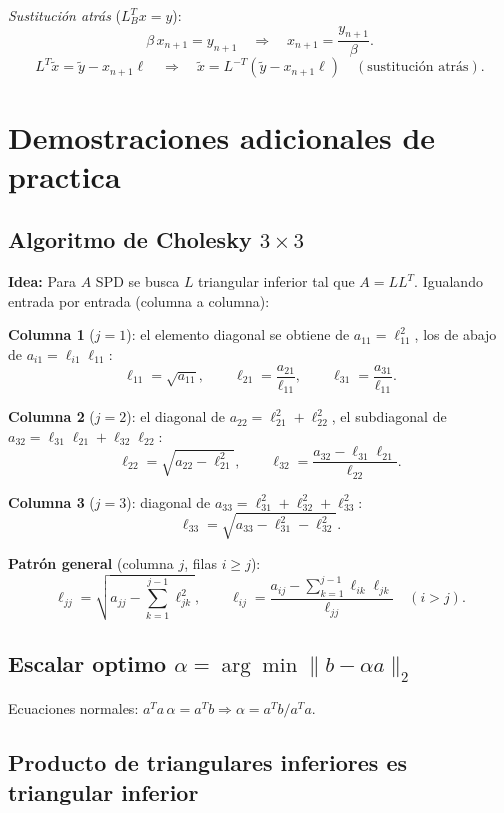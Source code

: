 \documentclass[11pt,a4paper]{article}
\begin{document}
\textit{Sustitución atrás} ($L_B^Tx=y$):
\[
  \beta\,x_{n+1}=y_{n+1} \quad\Rightarrow\quad x_{n+1}=\frac{y_{n+1}}{\beta}.
\]
\[
  L^T\tilde x = \tilde y - x_{n+1}\ell \quad\Rightarrow\quad \tilde x=L^{-T}(\tilde y-x_{n+1}\ell) \quad(\text{sustitución atrás}).
\]

\section{Demostraciones adicionales de practica}

\subsection{Algoritmo de Cholesky $3\times3$}
\label{sec:cholesky_3x3}

\textbf{Idea:} Para $A$ SPD se busca $L$ triangular inferior tal que $A=LL^T$. Igualando entrada por entrada (columna a columna):

\textbf{Columna 1} ($j=1$): el elemento diagonal se obtiene de $a_{11}=\ell_{11}^2$, los de abajo de $a_{i1}=\ell_{i1}\ell_{11}$:
\[
  \ell_{11}=\sqrt{a_{11}}, \qquad \ell_{21}=\frac{a_{21}}{\ell_{11}}, \qquad \ell_{31}=\frac{a_{31}}{\ell_{11}}.
\]

\textbf{Columna 2} ($j=2$): el diagonal de $a_{22} = \ell_{21}^2+\ell_{22}^2$, el subdiagonal de $a_{32}=\ell_{31}\ell_{21}+\ell_{32}\ell_{22}$:
\[
  \ell_{22}=\sqrt{a_{22}-\ell_{21}^2}, \qquad \ell_{32}=\frac{a_{32}-\ell_{31}\ell_{21}}{\ell_{22}}.
\]

\textbf{Columna 3} ($j=3$): diagonal de $a_{33}=\ell_{31}^2+\ell_{32}^2+\ell_{33}^2$:
\[
  \ell_{33}=\sqrt{a_{33}-\ell_{31}^2-\ell_{32}^2}.
\]

\textbf{Patrón general} (columna $j$, filas $i \ge j$):
\[
  \ell_{jj} = \sqrt{a_{jj} - \sum_{k=1}^{j-1}\ell_{jk}^2}, \qquad
  \ell_{ij} = \frac{a_{ij} - \sum_{k=1}^{j-1}\ell_{ik}\ell_{jk}}{\ell_{jj}}\quad (i>j).
\]

\subsection{Escalar optimo $\alpha = \arg\min\|b-\alpha a\|_2$}
\label{sec:escalar_alpha}

Ecuaciones normales: $a^Ta\,\alpha = a^Tb \Rightarrow \alpha = a^Tb / a^Ta$.

\subsection{Producto de triangulares inferiores es triangular inferior}
\end{document}
